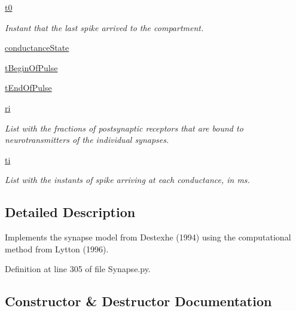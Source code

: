 \begin{DoxyCompactItemize}
\hyperlink{class_synapse_1_1_synapse_ad0adf1cb832bd7ce7918f2779171d7d7}{t0}
\begin{DoxyCompactList}\small\item\em Instant that the last spike arrived to the compartment. \end{DoxyCompactList}\item 
\hyperlink{class_synapse_1_1_synapse_a89d3762daa9c60be63403a5ce9fd9a84}{conductance\+State}
\item 
\hyperlink{class_synapse_1_1_synapse_acdc426c52a2a13183d5f8c54a830bfa2}{t\+Begin\+Of\+Pulse}
\item 
\hyperlink{class_synapse_1_1_synapse_adfd02fa815d45efd0cb1bc0124fe2c90}{t\+End\+Of\+Pulse}
\item 
\hyperlink{class_synapse_1_1_synapse_adc85234a081ad18bf19473be530dcf78}{ri}
\begin{DoxyCompactList}\small\item\em List with the fractions of postsynaptic receptors that are bound to neurotransmitters of the individual synapses. \end{DoxyCompactList}\item 
\hyperlink{class_synapse_1_1_synapse_a714c95723607acad52af96ad55b6c575}{ti}
\begin{DoxyCompactList}\small\item\em List with the instants of spike arriving at each conductance, in ms. \end{DoxyCompactList}\end{DoxyCompactItemize}


\subsection{Detailed Description}
Implements the synapse model from Destexhe (1994) using the computational method from Lytton (1996). 

Definition at line 305 of file Synapse.\+py.



\subsection{Constructor \& Destructor Documentation}
